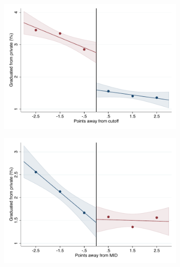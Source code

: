 \documentclass[oneside,11pt]{article}
\begin{document}
\begin{figure}[H]
\begin{center}
    \begin{subfigure}{0.475\textwidth}
        \centering
        \includegraphics[width=\textwidth]{04_Figures/rd_plot_tau_ENLACE_Privado_Un_IPN3.pdf}
    \end{subfigure}
    \begin{subfigure}{0.475\textwidth}
        \centering
        \includegraphics[width=\textwidth]{04_Figures/rd_plot_mid_ENLACE_Privado_Un_IPN3.pdf}
    \end{subfigure}


\end{center}
\end{figure}
\end{document}
